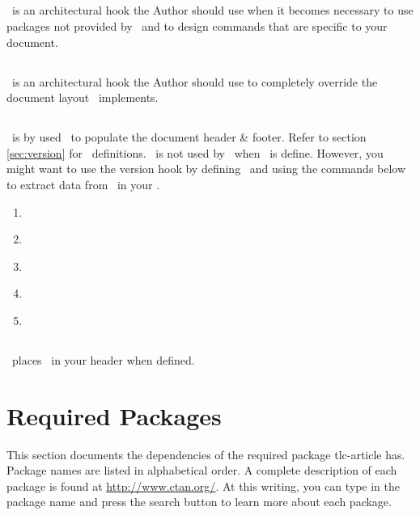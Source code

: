 \documentclass[12pt]{tlc-article}
\begin{document}
\subsection{\tlcAL}
\tlcAL\ is an architectural hook the Author should use when it becomes necessary
to use packages not provided by \tlcA\, and to design commands that are specific
to your document.

\subsection{\tlcHF}
\tlcHF\ is an architectural hook the Author should use to completely override
the document layout \tlcA\ implements.

\clearpage
\subsection{\tlcVE}
\tlcVE\ is by used \tlcA\ to populate the document header \& footer.  Refer to
section \ref{sec:version} for \tlcVE\ definitions. \tlcVE\ is not
used by \tlcA\ when \tlcHF\ is define.  However, you might want to use the
version hook by defining \tlcVE\ and using the commands below to extract data
from \tlcVE\ in your \tlcHF.
\begin{enumerate}
  \item \tlcVC\
  \item \tlcDC\
  \item \tlcSC\
  \item \tlcIC\
  \item \tlcPC\
\end{enumerate}

\subsection{\tlcLG}
\tlcA\ places \tlcLG\ in your header when defined.

\clearpage
\section{Required Packages}
This section documents the dependencies of the required package tlc-article has.
Package names are listed in alphabetical order. A complete description of each
package is found at \url{http://www.ctan.org/}. At this writing, you can type in
the package name and press the search button to learn more about each package.

\csvreader[tlcPkgStyle, separator=pipe]{\tlcPkgFile}{}{\name & \description}
\end{document}
